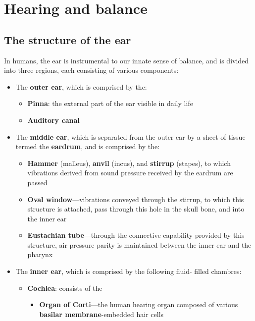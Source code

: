 \documentclass{article}
\begin{document}
\section{Hearing and balance}

\subsection{The structure of the ear}

In humans, the ear is instrumental to our innate sense of balance, and is
divided into three regions, each consisting of various components:

\begin{itemize}
	\item The \textbf{outer ear}, which is comprised by the:
		\begin{itemize}
			\item \textbf{Pinna}: the external part of the ear visible in daily
				life
			\item \textbf{Auditory canal}
		\end{itemize}
	\item The \textbf{middle ear}, which is separated from the outer ear by a
		sheet of tissue termed the \textbf{eardrum}, and is comprised by the:
		\begin{itemize}
			\item \textbf{Hammer} (malleus), \textbf{anvil} (incus), and
				\textbf{stirrup} (stapes), to which vibrations derived from sound
				pressure received by the eardrum are passed
			\item \textbf{Oval window}---vibrations conveyed through the
				stirrup, to which this structure is attached, pass through this
				hole in the skull bone, and into the inner ear
			\item \textbf{Eustachian tube}---through the connective capability
				provided by this structure, air pressure parity is maintained
				between the inner ear and the pharynx
		\end{itemize}
	\item The \textbf{inner ear}, which is comprised by the following fluid-
		filled chambres:
		\begin{itemize}
			\item \textbf{Cochlea}: consists of the
				\begin{itemize}
					\item \textbf{Organ of Corti}---the human hearing organ
						composed of various \textbf{basilar membrane}-embedded
						hair cells
				\end{itemize}
		\end{itemize}
\end{itemize}
\end{document}
